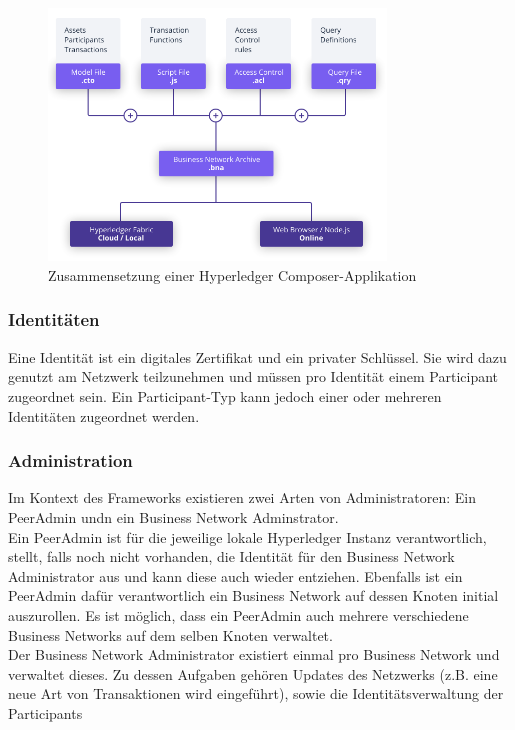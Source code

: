             \begin{figure}[H]
        		\centering
        		\includegraphics[width=0.8\textwidth]{graphics/Composer-Diagram.png}
        		\caption[Zusammensetzung einer Hyperledger Composer-Applikation]{Zusammensetzung einer Hyperledger Composer-Applikation\cite{ComposerDocs}}
        		\label{fig:composer_arch}
        	\end{figure}
        
        \subsubsection*{Identitäten}
            Eine Identität ist ein digitales Zertifikat und ein privater Schlüssel.
            Sie wird dazu genutzt am Netzwerk teilzunehmen und müssen pro Identität einem Participant zugeordnet sein.
            Ein Participant-Typ kann jedoch einer oder mehreren Identitäten zugeordnet werden.
            
        \subsubsection*{Administration}
            Im Kontext des Frameworks existieren zwei Arten von Administratoren: Ein PeerAdmin undn ein Business Network Adminstrator.\\
            Ein PeerAdmin ist für die jeweilige lokale Hyperledger Instanz verantwortlich, stellt, falls noch nicht vorhanden, die Identität für den Business Network Administrator aus und kann diese auch wieder entziehen. 
            Ebenfalls ist ein PeerAdmin dafür verantwortlich ein Business Network auf dessen Knoten initial auszurollen.
            Es ist möglich, dass ein PeerAdmin auch mehrere verschiedene Business Networks auf dem selben Knoten verwaltet.\\
            Der Business Network Administrator existiert einmal pro Business Network und verwaltet dieses.
            Zu dessen Aufgaben gehören Updates des Netzwerks (z.B. eine neue Art von Transaktionen wird eingeführt), sowie die Identitätsverwaltung der Participants
